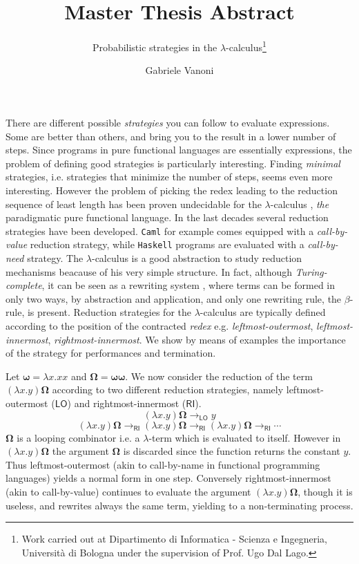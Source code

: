 \documentclass[english]{llncs}
\newcommand{\redlo}{\longrightarrow_\pslo}
\newcommand{\redri}{\longrightarrow_\psri}
\newcommand{\pslo}{\mathsf{LO}}
\newcommand{\psri}{\mathsf{RI}}
\begin{document}
\title{Master Thesis Abstract}
\subtitle{Probabilistic strategies in the $\lambda$-calculus\thanks{Work carried out at Dipartimento di Informatica - Scienza e Ingegneria, Università di Bologna under the supervision of Prof. Ugo Dal Lago.}}
\author{Gabriele Vanoni}
\maketitle
There are different possible \emph{strategies} you can follow to evaluate expressions. Some are better than others, and bring you to the result in a lower number of steps. Since programs in pure functional languages are essentially expressions, the problem of defining good strategies is particularly interesting. Finding \emph{minimal} strategies, i.e. strategies that minimize the number of steps, seems even more interesting. However the problem of picking the redex leading to the reduction sequence of least length has been proven undecidable for the $\lambda$-calculus \cite[Section~13.5]{barendregt_lambda_1984}, \emph{the} paradigmatic pure functional language. In the last decades several reduction strategies have been developed. \texttt{Caml} for example comes equipped with a \emph{call-by-value} reduction strategy, while \texttt{Haskell} programs are evaluated with a \emph{call-by-need} strategy. The $\lambda$-calculus is a good abstraction to study reduction mechanisms beacause of his very simple structure. In fact, although \emph{Turing-complete}, it can be seen as a rewriting system \cite{terese_term_2003}, where terms can be formed in only two ways, by abstraction and application, and only one rewriting rule, the $\beta$-rule, is present. Reduction strategies for the $\lambda$-calculus are typically defined according to the position of the contracted \emph{redex} e.g. \emph{leftmost-outermost}, \emph{leftmost-innermost}, \emph{rightmost-innermost}. We show by means of examples the importance of the strategy for performances and termination.
\begin{example}\label{example:canc}
	Let $\bm{\omega}=\lambda x.xx$ and $\bm{\Omega}=\bm{\omega\omega}$. We now consider the reduction of the term $(\lambda x.y)\bm{\Omega}$ according to two different reduction strategies, namely leftmost-outermost ($\pslo$) and rightmost-innermost ($\psri$).
	$$
	(\lambda x.y)\bm{\Omega}\redlo y
	$$
	$$
	(\lambda x.y)\bm{\Omega}\redri(\lambda x.y)\bm{\Omega}\redri(\lambda x.y)\bm{\Omega}\redri\cdots
	$$
	$\bm{\Omega}$ is a looping combinator i.e. a $\lambda$-term which is evaluated to itself. However in $(\lambda x.y)\bm{\Omega}$ the argument $\bm{\Omega}$ is discarded since the function returns the constant $y$. Thus leftmost-outermost (akin to call-by-name in functional programming languages) yields a normal form in one step. Conversely rightmost-innermost (akin to call-by-value) continues to evaluate the argument $(\lambda x.y)\bm{\Omega}$, though it is useless, and rewrites always the same term, yielding to a non-terminating process.
\end{example}
\end{document}
